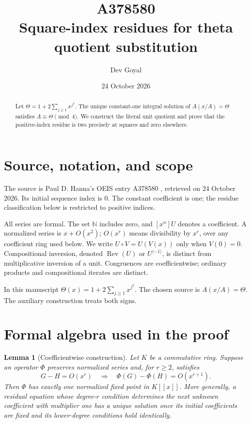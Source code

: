 \documentclass[11pt,a4paper]{article}
\title{A378580\\[4pt]\large Square-index residues for theta quotient substitution}
\author{Dev Goyal}
\date{24 October 2026}
\newtheorem{lemma}[theorem]{Lemma}
\theoremstyle{remark}
\newcommand{\N}{\mathbb N}
\newcommand{\ps}[1]{#1[[x]]}
\newcommand{\Rev}{\operatorname{Rev}}
\newcommand{\rev}{^{\langle-1\rangle}}
\begin{document}
\maketitle
\begin{center}
\end{center}
\begin{abstract}
Let $\Theta=1+2\sum_{j\ge1}x^{j^2}$. The unique constant-one integral solution of $A(x/A)=\Theta$ satisfies $A\equiv\Theta\pmod4$. We construct the literal unit quotient and prove that the positive-index residue is two precisely at squares and zero elsewhere.
\end{abstract}

\section{Source, notation, and scope}

The source is Paul D. Hanna's OEIS entry A378580 \cite{oeis580},
retrieved on 24 October 2026. Its initial sequence index is 0.
The constant coefficient is one; the residue classification below
is restricted to positive indices.

All series are formal. The set $\N$ includes zero, and $[x^n]U$ denotes a
coefficient. A normalized series is $x+O(x^2)$; $O(x^r)$ means divisibility
by $x^r$, over any coefficient ring used below. We write $U\circ V=U(V(x))$
only when $V(0)=0$. Compositional inversion, denoted $\Rev(U)$ or $U\rev$,
is distinct from multiplicative inversion of a unit. Congruences are
coefficientwise; ordinary products and compositional iterates are distinct.

In this manuscript $\Theta(x)=1+2\sum_{j\ge1}x^{j^2}$. The chosen source is
$A(x/A)=\Theta$. The auxiliary construction treats both signs.

\section{Formal algebra used in the proof}

\begin{lemma}[Coefficientwise construction]\label{lem:contraction}
Let $K$ be a commutative ring. Suppose an operator $\Phi$ preserves
normalized series and, for $r\ge2$, satisfies
\[
 G-H=O(x^r)\quad\Longrightarrow\quad
 \Phi(G)-\Phi(H)=O(x^{r+1}).
\]
Then $\Phi$ has exactly one normalized fixed point in $\ps K$.
More generally, a residual equation whose degree-$r$ condition determines
the next unknown coefficient with multiplier one has a unique solution
once its initial coefficients are fixed and its lower-degree conditions
hold identically.
\end{lemma}
\end{document}
